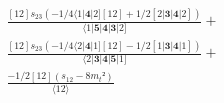 \documentclass[varwidth, border=5pt]{standalone}
\begin{document}
\begin{my}
$\begin{gathered}
\scriptscriptstyle\frac{[12]s_{23}(-1/4⟨1|𝟒|2][12]+1/2[2|𝟑|𝟒|2])}{⟨1|𝟓|𝟒|𝟑|2]} +\\
\scriptscriptstyle\frac{[12]s_{23}(-1/4⟨2|𝟒|1][12]-1/2[1|𝟑|𝟒|1])}{⟨2|𝟑|𝟒|𝟓|1]} +\\
\scriptscriptstyle\frac{-1/2[12](s_{12}-8m_t²)}{⟨12⟩} \phantom{+}
\end{gathered}$
\end{my}
\end{document}
